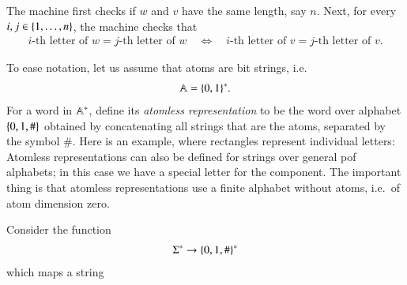 


{
    The machine first checks if $w$ and $v$ have the same length, say $n$. Next, for every $i, j \in \{1,\ldots,n\}$, the machine checks that 
    \begin{gather*}
    \text{$i$-th letter of $w$} = \text{$j$-th letter of $w$}
    \quad \Leftrightarrow \quad
    \text{$i$-th letter of $v$} = \text{$j$-th letter of $v$}.
    \end{gather*}
}




{
    To ease notation, let us assume that atoms are bit strings, i.e.
    \begin{align*}
    \mathbb A = \{0,1\}^*.
    \end{align*}
    For a word in $\mathbb A^*$, define its \emph{atomless representation} to be the word over alphabet $\{0,1,\#\}$ obtained by concatenating all strings that are the atoms, separated by the symbol $\#$. Here is an example, where rectangles represent individual letters:
    Atomless representations can also be defined for strings over general pof alphabets; in this case we have a special letter for the component. The important thing is that atomless representations use a finite alphabet without atoms, i.e.~of atom dimension zero.

    Consider the function 
    \begin{align*}
    \Sigma^* \to \{0,1,\#\}^*
    \end{align*}
    which maps a string 

}

{}

